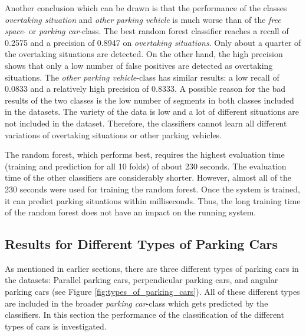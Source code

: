 Another conclusion which can be drawn is that the performance of the classes \emph{overtaking situation} and \emph{other parking vehicle} is much worse than of the \emph{free space}- or \emph{parking car}-class. The best random forest classifier reaches a recall of 0.2575 and a precision of 0.8947 on \emph{overtaking situations}. Only about a quarter of the overtaking situations are detected. 
On the other hand, the high precision shows that only a low number of false positives are detected as overtaking situations. 
The \emph{other parking vehicle}-class has similar results: a low recall of 0.0833 and a relatively high precision of 0.8333.
A possible reason for the bad results of the two classes is the low number of segments in both classes included in the datasets. The variety of the data is low and a lot of different situations are not included in the dataset. Therefore, the classifiers cannot learn all different variations of overtaking situations or other parking vehicles.

The random forest, which performs best, requires the highest evaluation time (training and prediction for all 10 folds) of about 230 seconds. The evaluation time of the other classifiers are considerably shorter. However, almost all of the 230 seconds were used for training the random forest. Once the system is trained, it can predict parking situations within milliseconds. Thus, the long training time of the random forest does not have an impact on the running system.





\subsection{Results for Different Types of Parking Cars}

As mentioned in earlier sections, there are three different types of parking cars in the datasets: Parallel parking cars, perpendicular parking cars, and angular parking cars (see Figure \ref{fig:types_of_parking_cars}). All of these different types are included in the broader \emph{parking car}-class which gets predicted by the classifiers. In this section the performance of the classification of the different types of cars is investigated.


